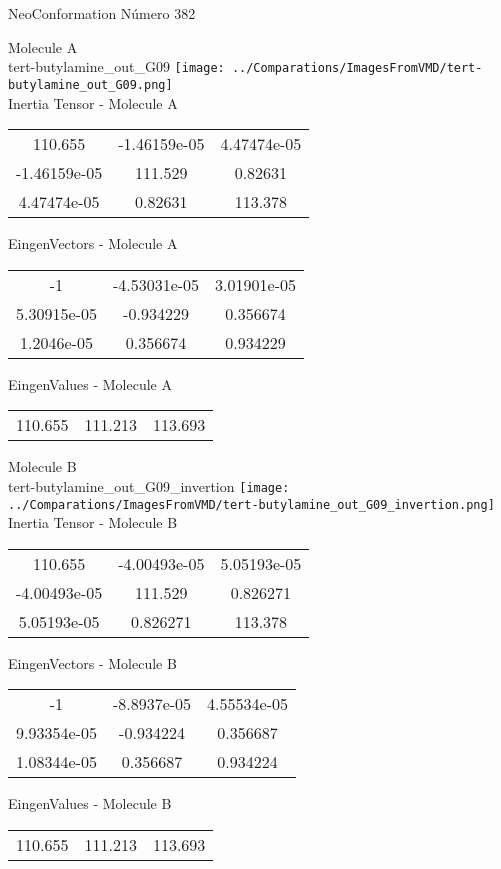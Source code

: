 \vtab[-2cm]
\begin{center}
{\large NeoConformation \tab Número 382}
\end{center}
\begin{multicols}{2}
\begin{center}

Molecule A \\ 
tert-butylamine\_out\_G09
\texttt{[image: ../Comparations/ImagesFromVMD/tert-butylamine\_out\_G09.png]}
\\
Inertia Tensor - Molecule A \\
\vtab

\begin{tabular}{|c c c|}
110.655	 & 	-1.46159e-05	 & 	4.47474e-05	 \\
-1.46159e-05	 & 	111.529	 & 	0.82631	 \\
4.47474e-05	 & 	0.82631	 & 	113.378
\end{tabular}

\vtab
 EingenVectors - Molecule A     \\
\vtab
\begin{tabular}{|c c c|}
-1	 & 	-4.53031e-05	 & 	3.01901e-05	 \\
5.30915e-05	 & 	-0.934229	 & 	0.356674	 \\
1.2046e-05	 & 	0.356674	 & 	0.934229
\end{tabular}

\vtab
 EingenValues - Molecule A     \\
\vtab
\begin{tabular}{|c c c|}
110.655	 & 	111.213	 & 	113.693	 \\
\end{tabular}
\columnbreak

Molecule B \\ 
tert-butylamine\_out\_G09\_invertion
\texttt{[image: ../Comparations/ImagesFromVMD/tert-butylamine\_out\_G09\_invertion.png]}
\\
Inertia Tensor - Molecule B \\
\vtab

\begin{tabular}{|c c c|}
110.655	 & 	-4.00493e-05	 & 	5.05193e-05	 \\
-4.00493e-05	 & 	111.529	 & 	0.826271	 \\
5.05193e-05	 & 	0.826271	 & 	113.378
\end{tabular}

\vtab
 EingenVectors - Molecule B     \\
\vtab
\begin{tabular}{|c c c|}
-1	 & 	-8.8937e-05	 & 	4.55534e-05	 \\
9.93354e-05	 & 	-0.934224	 & 	0.356687	 \\
1.08344e-05	 & 	0.356687	 & 	0.934224
\end{tabular}

\vtab
 EingenValues - Molecule B     \\
\vtab
\begin{tabular}{|c c c|}
110.655	 & 	111.213	 & 	113.693	 \\
\end{tabular}

\end{center}
\end{multicols}
